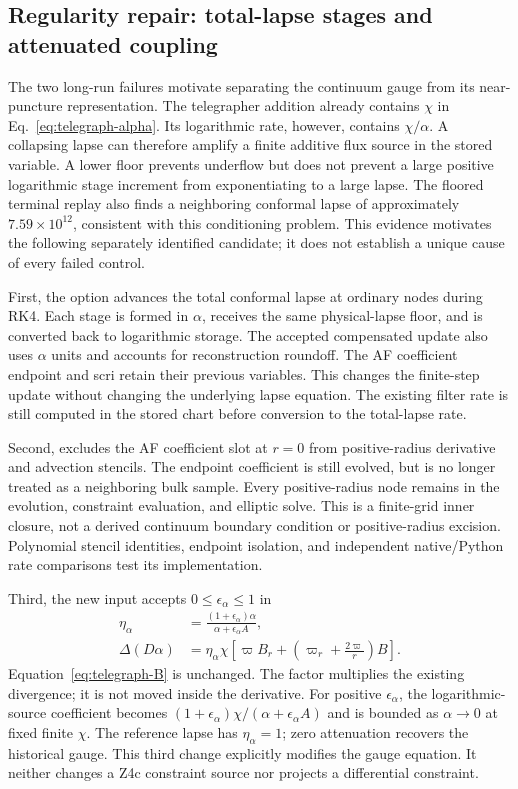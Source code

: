 \subsection{Regularity repair: total-lapse stages and attenuated coupling}
\label{sec:tele-repair}
The two long-run failures motivate separating the continuum gauge from its near-puncture representation. The telegrapher addition already contains $\chi$ in Eq.~\eqref{eq:telegraph-alpha}. Its logarithmic rate, however, contains $\chi/\alpha$. A collapsing lapse can therefore amplify a finite additive flux source in the stored variable. A lower floor prevents underflow but does not prevent a large positive logarithmic stage increment from exponentiating to a large lapse. The floored terminal replay also finds a neighboring conformal lapse of approximately $7.59\times10^{12}$, consistent with this conditioning problem. This evidence motivates the following separately identified candidate; it does not establish a unique cause of every failed control.

First, the option  advances the total conformal lapse at ordinary nodes during RK4. Each stage is formed in $\alpha$, receives the same physical-lapse floor, and is converted back to logarithmic storage. The accepted compensated update also uses $\alpha$ units and accounts for reconstruction roundoff. The AF coefficient endpoint and scri retain their previous variables. This changes the finite-step update without changing the underlying lapse equation. The existing filter rate is still computed in the stored chart before conversion to the total-lapse rate.

Second,  excludes the AF coefficient slot at $r=0$ from positive-radius derivative and advection stencils. The endpoint coefficient is still evolved, but is no longer treated as a neighboring bulk sample. Every positive-radius node remains in the evolution, constraint evaluation, and elliptic solve. This is a finite-grid inner closure, not a derived continuum boundary condition or positive-radius excision. Polynomial stencil identities, endpoint isolation, and independent native/Python rate comparisons test its implementation.

Third, the new input  accepts $0\leq\epsilon_\alpha\leq1$ in
\begin{align}
 \eta_\alpha&=\frac{(1+\epsilon_\alpha)\alpha}
 {\alpha+\epsilon_\alpha A},\\
 \Delta(D\alpha)&=\eta_\alpha\chi
 \left[\varpi B_r+\left(\varpi_r+\frac{2\varpi}{r}\right)B\right].
 \label{eq:attenuated-lapse}
\end{align}
Equation~\eqref{eq:telegraph-B} is unchanged. The factor multiplies the existing divergence; it is not moved inside the derivative. For positive $\epsilon_\alpha$, the logarithmic-source coefficient becomes $(1+\epsilon_\alpha)\chi/(\alpha+\epsilon_\alpha A)$ and is bounded as $\alpha\to0$ at fixed finite $\chi$. The reference lapse has $\eta_\alpha=1$; zero attenuation recovers the historical gauge. This third change explicitly modifies the gauge equation. It neither changes a Z4c constraint source nor projects a differential constraint.

